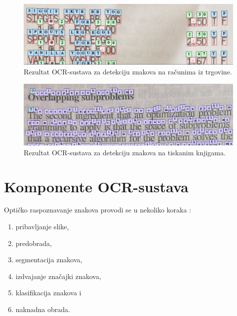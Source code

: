 \documentclass[times, utf8, zavrsni]{fer}
\begin{document}
\begin{figure}[htb]
    \centering
    \includegraphics[width=\textwidth]{images/receipt-example-01.png}
    \caption{Rezultat OCR-sustava za detekciju znakova na računima iz trgovine.}
    \label{fig:receipt-example-01}
\end{figure}

\begin{figure}[htb]
    \centering
    \includegraphics[width=\textwidth]{images/book-example-01.png}
    \caption{Rezultat OCR-sustava za detekciju znakova na tiskanim knjigama.}
    \label{fig:book-example-01}
\end{figure}

\pagebreak








\section{Komponente OCR-sustava}
\label{sec:komponente-ocr-sustava}
Optičko raspoznavanje znakova provodi se u nekoliko koraka
\citep{DBLP:journals/corr/abs-1710-05703,kaur2016survey}:

\begin{enumerate}
    \item pribavljanje slike,
    \item predobrada,
    \item segmentacija znakova,
    \item izdvajanje značajki znakova,
    \item klasifikacija znakova i
    \item naknadna obrada.
\end{enumerate}
\end{document}
